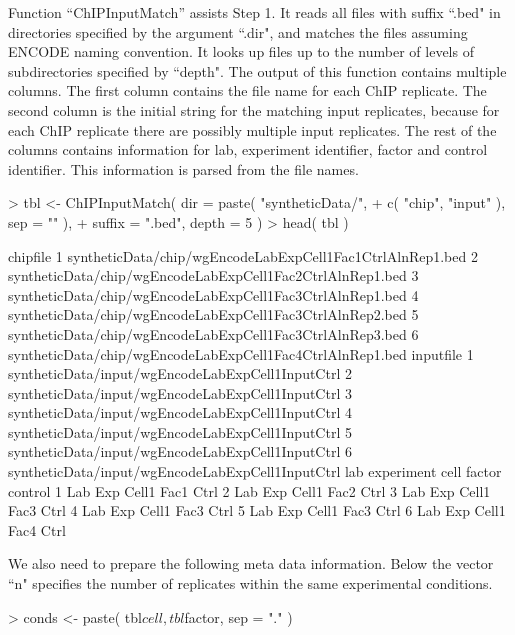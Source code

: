 \documentclass[a4paper,10pt]{article}
\begin{document}
Function ``ChIPInputMatch'' assists Step 1. It reads all files with suffix ``.bed" in directories specified by the argument ``.dir", and matches the files assuming ENCODE naming convention. It looks up files up to the number of levels of subdirectories specified by ``depth". The output of this function contains multiple columns. The first column contains the file name for each ChIP replicate. The second column is the initial string for the matching input replicates, because for each ChIP replicate there are possibly multiple input replicates. The rest of the columns contains information for lab, experiment identifier, factor and control identifier. This information is parsed from the file names.

\begin{Schunk}
\begin{Sinput}
> tbl <- ChIPInputMatch( dir = paste( "syntheticData/", 
+                          c( "chip", "input" ), sep = "" ), 
+                       suffix = ".bed", depth = 5 )
> head( tbl )
\end{Sinput}
\begin{Soutput}
                                                   chipfile
1 syntheticData/chip/wgEncodeLabExpCell1Fac1CtrlAlnRep1.bed
2 syntheticData/chip/wgEncodeLabExpCell1Fac2CtrlAlnRep1.bed
3 syntheticData/chip/wgEncodeLabExpCell1Fac3CtrlAlnRep1.bed
4 syntheticData/chip/wgEncodeLabExpCell1Fac3CtrlAlnRep2.bed
5 syntheticData/chip/wgEncodeLabExpCell1Fac3CtrlAlnRep3.bed
6 syntheticData/chip/wgEncodeLabExpCell1Fac4CtrlAlnRep1.bed
                                         inputfile
1 syntheticData/input/wgEncodeLabExpCell1InputCtrl
2 syntheticData/input/wgEncodeLabExpCell1InputCtrl
3 syntheticData/input/wgEncodeLabExpCell1InputCtrl
4 syntheticData/input/wgEncodeLabExpCell1InputCtrl
5 syntheticData/input/wgEncodeLabExpCell1InputCtrl
6 syntheticData/input/wgEncodeLabExpCell1InputCtrl
  lab experiment  cell factor control
1 Lab        Exp Cell1   Fac1    Ctrl
2 Lab        Exp Cell1   Fac2    Ctrl
3 Lab        Exp Cell1   Fac3    Ctrl
4 Lab        Exp Cell1   Fac3    Ctrl
5 Lab        Exp Cell1   Fac3    Ctrl
6 Lab        Exp Cell1   Fac4    Ctrl
\end{Soutput}
\end{Schunk}

We also need to prepare the following meta data information. Below the vector ``n" specifies the number of replicates within the same experimental conditions.

\begin{Schunk}
\begin{Sinput}
> conds <- paste( tbl$cell, tbl$factor, sep = "." )
\end{Sinput}
\end{Schunk}
\end{document}
